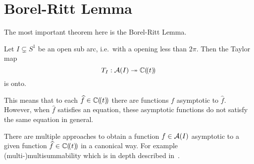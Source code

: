 \section{Borel-Ritt Lemma}
\begin{comment}
  \begin{itemize}
    \item \cite[Lem.II.2.2.5]{sabbah_cimpa90}: $T_I$
    \item \textbf{\cite[Th.7.3]{van2003galois}}: $T_I=T_{(a,b)}$
    \item \cite[Th.2.4.1]{Loday2014}: $T_{\mathfrak{s}}$
    \item \cite[4.4.Thm.16]{Balser2000Formal}
  \end{itemize}
\end{comment}
The most important theorem here is the Borel-Ritt Lemma.
\begin{thm}
  \label{thm:borel-ritt}
  Let $I\subsetneq S^1$ be an open sub arc, i.e.\ with a opening less than
  $2\pi$. Then the Taylor map
  \[
    T_{I}:\mathcal{A}(I)\twoheadrightarrow\mathbb{C}(\!(t)\!)
  \]
  is onto.
  \begin{s-rem}
    This means that to each $\widehat f\in\mathbb{C}(\!(t)\!)$ there are functions $f$
    asymptotic to $\hat f$.
    However, when $\hat f$ satisfies an equation, these asymptotic functions do
    not satisfy the same equation in general.
     
  \end{s-rem}
\end{thm}
There are multiple approaches to obtain a function $f\in\mathcal{A}(I)$ asymptotic to a
given function $\widehat f\in\mathbb{C}(\!(t)\!)$ in a canonical way. For example
(multi-)multisummability which is in depth described in~\cite{Loday2014}.
